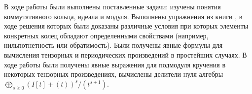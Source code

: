В ходе работы были выполнены поставленные задачи: изучены понятия коммутативного кольца, идеала и модуля. Выполнены упражнения из
книги \cite{A-M}, в ходе решения которых были доказаны различные условия при которых элементы конкретных колец 
обладают определенными свойствами (например, нильпотнетность или обратимость). 
Были получены явные формулы для вычисления тензорных и периодических произведений в простейших случаях.
В ходе работы были получены явные выражения для подмодуля кручения в некоторых тензорных произведениях,
вычислены делители нуля алгебры $\bigoplus_{s \geq 0}{(I[t] + (t))^s / (t^{s + 1})}$.